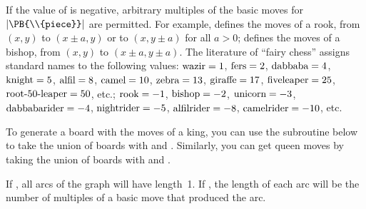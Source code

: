 If the value of  is negative, arbitrary multiples of the basic
moves
for $\vert\PB{\\{piece}}\vert$ are permitted. For example,  defines the
moves of a rook, from $(x,y)$ to $(x\pm a,y)$ or to $(x,y\pm a)$ for all
$a>0$;  defines the moves of a bishop, from $(x,y)$
to
$(x\pm a,y\pm a)$. The literature of ``fairy chess'' assigns standard names
to the following  values: $\rm wazir=1$, $\rm fers=2$, $\rm
dabbaba=4$,
$\rm knight=5$, $\rm alfil=8$, $\rm camel=10$, $\rm zebra=13$, $\rm giraffe
=17$, $\rm fiveleaper=25$, $\hbox{root-50-leaper}=50$, etc.; $\rm rook=-1$,
$\rm bishop=-2$, $\rm unicorn=-3$, $\rm dabbabarider=-4$, $\rm nightrider=-5$,
$\rm alfilrider=-8$, $\rm camelrider=-10$, etc.

To generate a board with the moves of a king, you can use the 
subroutine below to take the union of boards with  and
. Similarly, you can get queen moves by taking the union
of
boards with  and .

If , all arcs of the graph will have length~1. If , the
length of each arc will be the number of multiples of a basic move that
produced the arc.

\fi

